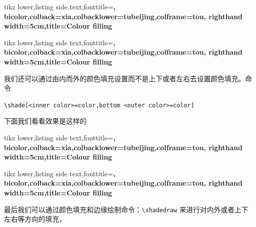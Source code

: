 \documentclass[cn,11pt, simple]{elegantbook}
\begin{document}
\begin{tcblisting}{tikz lower,listing side text,fonttitle=\bfseries,
	bicolor,colback=xia,colbacklower=tubeijing,colframe=tou,
	righthand width=5cm,title=Colour filling}
\end{tcblisting}

\begin{tcblisting}{tikz lower,listing side text,fonttitle=\bfseries,
	bicolor,colback=xia,colbacklower=tubeijing,colframe=tou,
	righthand width=5cm,title=Colour filling}
\end{tcblisting}

我们还可以通过由内而外的颜色填充设置而不是上下或者左右去设置颜色填充。命令

\verb|\shade[<inner color>=color,bottom <outer color>=color]|

下面我们看看效果是这样的
\begin{tcblisting}{tikz lower,listing side text,fonttitle=\bfseries,
	bicolor,colback=xia,colbacklower=tubeijing,colframe=tou,
	righthand width=5cm,title=Colour filling}
\end{tcblisting}

\begin{tcblisting}{tikz lower,listing side text,fonttitle=\bfseries,
	bicolor,colback=xia,colbacklower=tubeijing,colframe=tou,
	righthand width=5cm,title=Colour filling}
\end{tcblisting}

最后我们可以通过颜色填充和边缘绘制命令：\verb|\shadedraw| 来进行对内外或者上下左右等方向的填充，
\end{document}

